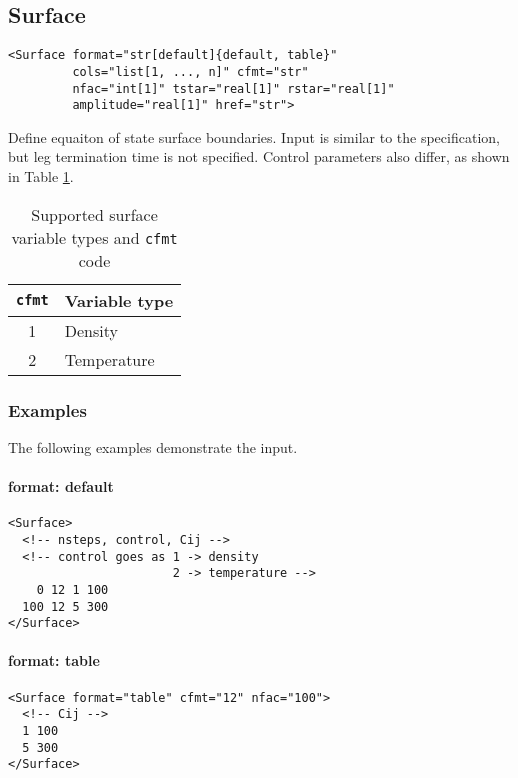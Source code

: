 \documentclass[11pt]{report}
\newcommand{\reqdtag}[1]{\Red{\texttt{<#1>}}}
\newcommand{\supporting}[1]{\texttt{Supporting Drivers: #1}}
\begin{document}
\subsection{Surface}
\begin{verbatim}
<Surface format="str[default]{default, table}"
         cols="list[1, ..., n]" cfmt="str"
         nfac="int[1]" tstar="real[1]" rstar="real[1]"
         amplitude="real[1]" href="str">
\end{verbatim}
%
Define equaiton of state surface boundaries. Input is similar to the
\reqdtag{Path} specification, but leg termination time is not specified.
Control parameters also differ, as shown in Table \ref{tab:cfmt-1}.

\begin{table}[h!]
  \centering
  \begin{tabular}[h]{cl}
    \hline
    \hline
    \texttt{cfmt} & Variable type \\
    \hline
    1 & Density \\
    2 & Temperature
  \end{tabular}
  \caption{Supported surface variable types and \texttt{cfmt} code}
  \label{tab:cfmt-1}
\end{table}

\subsubsection{Examples}
The following examples demonstrate the \reqdtag{Surface} input.

\paragraph{format: default}
\begin{verbatim}
<Surface>
  <!-- nsteps, control, Cij -->
  <!-- control goes as 1 -> density
                       2 -> temperature -->
    0 12 1 100
  100 12 5 300
</Surface>
\end{verbatim}

\paragraph{format: table}
\begin{verbatim}
<Surface format="table" cfmt="12" nfac="100">
  <!-- Cij -->
  1 100
  5 300
</Surface>
\end{verbatim}
\end{document}
